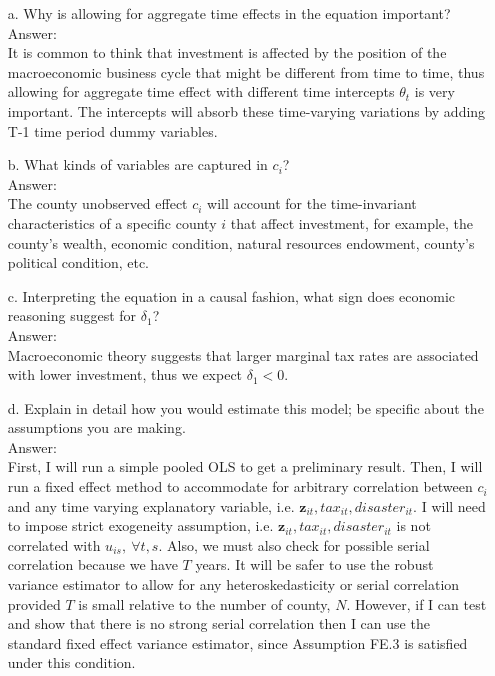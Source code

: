 \documentclass[10pt]{article}
\begin{document}
\begin{enumerate}
\item[a.] Why is allowing for aggregate time effects in the equation important?
\\ Answer: \\ 
It is common to think that investment is affected by the position of the macroeconomic business cycle that might be different from time to time, thus allowing for aggregate time effect with different time intercepts $\theta_t$ is very important. The intercepts will absorb these time-varying variations by adding T-1 time period dummy variables.

\item[b.] What kinds of variables are captured in $c_i$? 
\\ Answer: \\
The county unobserved effect $c_i$ will account for the time-invariant characteristics of a specific county $i$ that affect investment, for example, the county's wealth, economic condition, natural resources endowment, county's political condition, etc.

\item[c.] Interpreting the equation in a causal fashion, what sign does economic reasoning suggest for $\delta_1$? 
\\ Answer: \\
Macroeconomic theory suggests that larger marginal tax rates are associated with lower investment, thus we expect $\delta_1<0.$

\item[d.] Explain in detail how you would estimate this model; be specific about the assumptions you are making. 
\\ Answer: \\
First, I will run a simple pooled OLS to get a preliminary result. Then, I will run a fixed effect method to accommodate for arbitrary correlation between $c_i$ and any time varying explanatory variable, i.e. $\textbf{z}_{it}, tax_{it}, disaster_{it}.$ I will need to impose strict exogeneity assumption, i.e. $\textbf{z}_{it}, tax_{it}, disaster_{it}$ is not correlated with $u_{is},\ \forall t,s.$ Also, we must also check for possible serial correlation because we have $T$ years. It will be safer to use the robust variance estimator to allow for any heteroskedasticity or serial correlation provided $T$ is small relative to the number of county, $N$. However, if I can test and show that there is no strong serial correlation then I can use the standard fixed effect variance estimator, since Assumption FE.3 is satisfied under this condition.


\end{enumerate}
\end{document}
